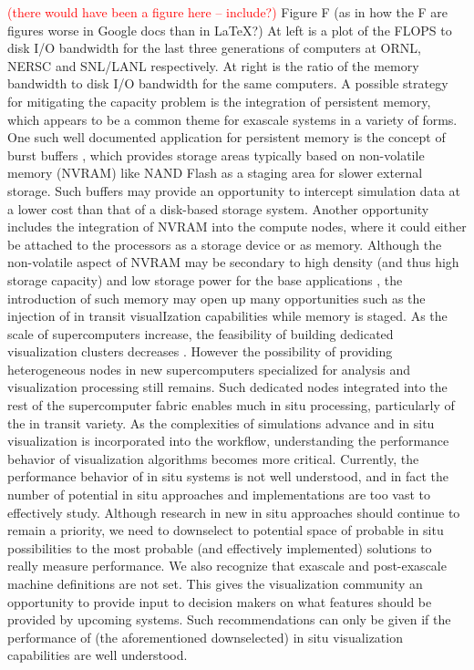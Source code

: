 \begin{refsection}
\textcolor{red}{(there would have been a figure here -- include?)}
Figure F (as in how the F are figures worse in Google docs than in LaTeX?) At left is a plot of the FLOPS to disk I/O bandwidth for the last three generations of computers at ORNL, NERSC and SNL/LANL respectively. At right is the ratio of the memory bandwidth to disk I/O bandwidth for the same computers.
A possible strategy for mitigating the capacity problem is the integration of persistent memory, which appears to be a common theme for exascale systems in a variety of forms. One such well documented application for persistent memory is the concept of burst buffers \cite{Bent12}, which provides storage areas typically based on non-volatile memory (NVRAM) like NAND Flash as a staging area for slower external storage. Such buffers may provide an opportunity to intercept simulation data at a lower cost than that of a disk-based storage system. Another opportunity includes the integration of NVRAM into the compute nodes, where it could either be attached to the processors as a storage device or as memory. Although the non-volatile aspect of NVRAM may be secondary to high density (and thus high storage capacity) and low storage power for the base applications \cite{Caulfield2010}, the introduction of such memory may open up many opportunities such as the injection of in transit visualIzation capabilities while memory is staged.
As the scale of supercomputers increase, the feasibility of building dedicated visualization clusters decreases \cite{Chi07}. However the possibility of providing heterogeneous nodes in new supercomputers specialized for analysis and visualization processing still remains. Such dedicated nodes integrated into the rest of the supercomputer fabric enables much in situ processing, particularly of the in transit variety.
As the complexities of simulations advance and in situ visualization is incorporated into the workflow, understanding the performance behavior of visualization algorithms becomes more critical. Currently, the performance behavior of in situ systems is not well understood, and in fact the number of potential in situ approaches and implementations are too vast to effectively study. Although research in new in situ approaches should continue to remain a priority, we need to downselect to potential space of probable in situ possibilities to the most probable (and effectively implemented) solutions to really measure performance.
We also recognize that exascale and post-exascale machine definitions are not set. This gives the visualization community an opportunity to provide input to decision makers on what features should be provided by upcoming systems. Such recommendations can only be given if the performance of (the aforementioned downselected) in situ visualization capabilities are well understood.


\end{refsection}

